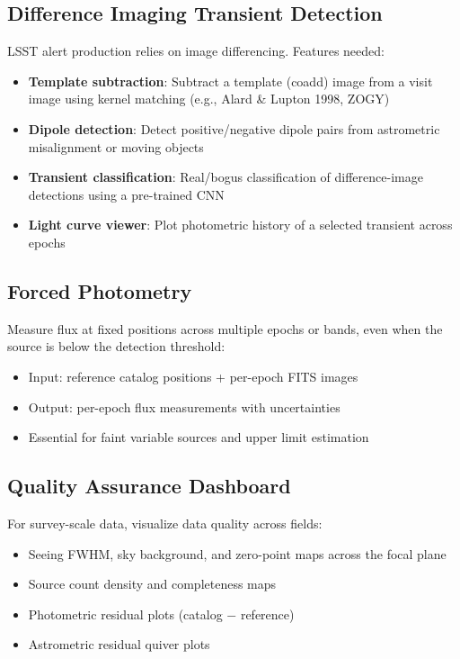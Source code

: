 \documentclass[11pt,fleqn]{book}
\begin{document}
\subsection{Difference Imaging Transient Detection}

LSST alert production relies on image differencing. Features needed:
\begin{itemize}[leftmargin=2em]
  \item \textbf{Template subtraction}: Subtract a template (coadd) image from a visit image using kernel matching (e.g., Alard \& Lupton 1998, ZOGY)
  \item \textbf{Dipole detection}: Detect positive/negative dipole pairs from astrometric misalignment or moving objects
  \item \textbf{Transient classification}: Real/bogus classification of difference-image detections using a pre-trained CNN
  \item \textbf{Light curve viewer}: Plot photometric history of a selected transient across epochs
\end{itemize}

\subsection{Forced Photometry}

Measure flux at fixed positions across multiple epochs or bands, even when the source is below the detection threshold:
\begin{itemize}[leftmargin=2em]
  \item Input: reference catalog positions + per-epoch FITS images
  \item Output: per-epoch flux measurements with uncertainties
  \item Essential for faint variable sources and upper limit estimation
\end{itemize}

\subsection{Quality Assurance Dashboard}

For survey-scale data, visualize data quality across fields:
\begin{itemize}[leftmargin=2em]
  \item Seeing FWHM, sky background, and zero-point maps across the focal plane
  \item Source count density and completeness maps
  \item Photometric residual plots (catalog $-$ reference)
  \item Astrometric residual quiver plots
\end{itemize}
\end{document}
